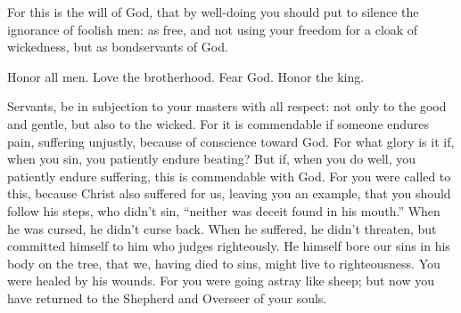 {For this is the will of God, that by well-doing you should put to silence the ignorance of foolish men:
as free, and not using your freedom for a cloak of wickedness, but as bondservants of God.
\par }{\PP {}Honor all men. Love the brotherhood. Fear God. Honor the king.
\par }{\PP {}Servants, be in subjection to your masters with all respect: not only to the good and gentle, but also to the wicked.
For it is commendable if someone endures pain, suffering unjustly, because of conscience toward God.
For what glory is it if, when you sin, you patiently endure beating? But if, when you do well, you patiently endure suffering, this is commendable with God.
For you were called to this, because Christ also suffered for us, leaving you an example, that you should follow his steps,
who didn’t sin, “neither was deceit found in his mouth.”
When he was cursed, he didn’t curse back. When he suffered, he didn’t threaten, but committed himself to him who judges righteously.
He himself bore our sins in his body on the tree, that we, having died to sins, might live to righteousness. You were healed by his wounds.
For you were going astray like sheep; but now you have returned to the Shepherd and Overseer of your souls.

}
